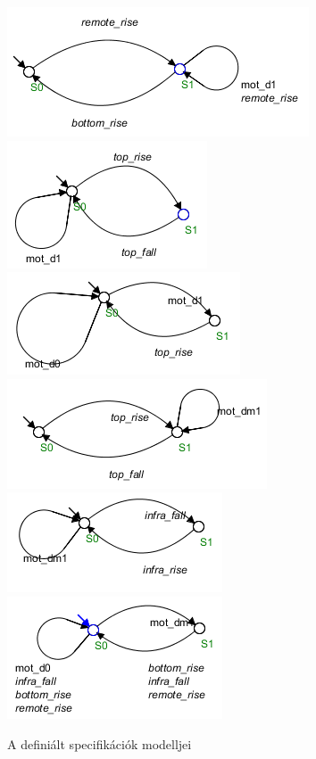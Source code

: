 \begin{figure}
	\centering
	\includegraphics[keepaspectratio]{figures/2m03/b_spec1.png}
	\includegraphics[keepaspectratio]{figures/2m03/b_spec2.png}
	\includegraphics[keepaspectratio]{figures/2m03/b_spec3.png}
	\includegraphics[keepaspectratio]{figures/2m03/b_spec4.png}
	\includegraphics[keepaspectratio]{figures/2m03/b_spec5.png}
	\includegraphics[keepaspectratio]{figures/2m03/b_spec6.png}
	\caption{A definiált specifikációk modelljei}
	\label{fig:SpecAll}
\end{figure}

